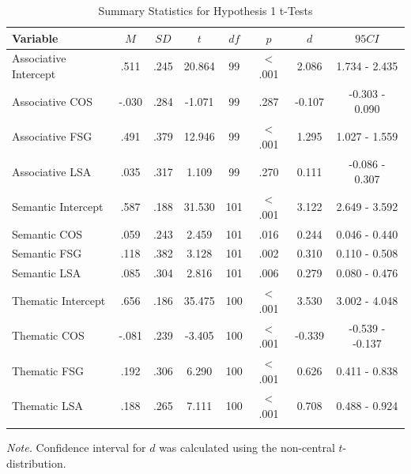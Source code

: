 \documentclass[english,man]{apa6}
\theoremstyle{definition}
\theoremstyle{definition}
\theoremstyle{definition}
\theoremstyle{remark}
\begin{document}
\begin{table}[tbp]
\begin{center}
\begin{threeparttable}
\caption{\label{tab:hyp1-table1}Summary Statistics for Hypothesis 1 t-Tests}
\begin{tabular}{lccccccc}
\toprule
Variable & \multicolumn{1}{c}{$M$} & \multicolumn{1}{c}{$SD$} & \multicolumn{1}{c}{$t$} & \multicolumn{1}{c}{$df$} & \multicolumn{1}{c}{$p$} & \multicolumn{1}{c}{$d$} & \multicolumn{1}{c}{$95 CI$}\\
\midrule
Associative Intercept & .511 & .245 & 20.864 & 99 & < .001 & 2.086 & 1.734 - 2.435\\
Associative COS & -.030 & .284 & -1.071 & 99 & .287 & -0.107 & -0.303 - 0.090\\
Associative FSG & .491 & .379 & 12.946 & 99 & < .001 & 1.295 & 1.027 - 1.559\\
Associative LSA & .035 & .317 & 1.109 & 99 & .270 & 0.111 & -0.086 - 0.307\\
Semantic Intercept & .587 & .188 & 31.530 & 101 & < .001 & 3.122 & 2.649 - 3.592\\
Semantic COS & .059 & .243 & 2.459 & 101 & .016 & 0.244 & 0.046 - 0.440\\
Semantic FSG & .118 & .382 & 3.128 & 101 & .002 & 0.310 & 0.110 - 0.508\\
Semantic LSA & .085 & .304 & 2.816 & 101 & .006 & 0.279 & 0.080 - 0.476\\
Thematic Intercept & .656 & .186 & 35.475 & 100 & < .001 & 3.530 & 3.002 - 4.048\\
Thematic COS & -.081 & .239 & -3.405 & 100 & < .001 & -0.339 & -0.539 - -0.137\\
Thematic FSG & .192 & .306 & 6.290 & 100 & < .001 & 0.626 & 0.411 - 0.838\\
Thematic LSA & .188 & .265 & 7.111 & 100 & < .001 & 0.708 & 0.488 - 0.924\\
\bottomrule
\addlinespace
\end{tabular}
\begin{tablenotes}[para]
\textit{Note.} Confidence interval for $d$ was calculated using the non-central $t$-distribution. 
\end{tablenotes}
\end{threeparttable}
\end{center}
\end{table}
\end{document}
